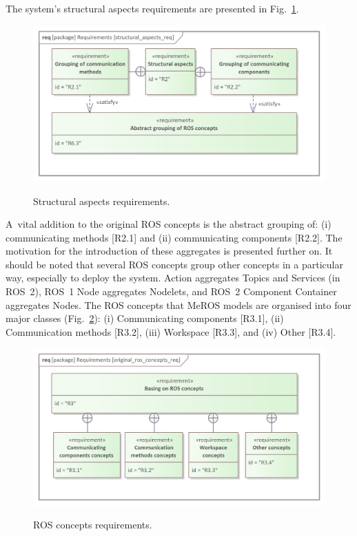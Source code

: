 \documentclass[11pt,oneside,a4paper]{article}
\begin{document}
	The system's structural aspects requirements are presented in Fig.~\ref{fig:structural_aspects_req}.
	
	\begin{figure}[H]
		\centering
		\begin{center}
			{\includegraphics[scale=0.95]{img/requirement_pkg/structural_aspects_req.png}}
		\end{center}
		\caption{Structural aspects requirements.} 
		\label{fig:structural_aspects_req}
	\end{figure}
	
	A~vital addition to the original ROS concepts is the abstract grouping of: (i) communicating methods [R2.1] and (ii) communicating components [R2.2]. The motivation for the introduction of these aggregates is presented further on. It should be noted that several ROS concepts group other concepts in a particular way, especially to deploy the system. Action aggregates Topics and Services (in ROS~2), ROS~1 Node aggregates Nodelets, and ROS~2 Component Container aggregates Nodes.
	The ROS concepts that MeROS models are organised into four major classes (Fig.~\ref{fig:ros_concepts_req}): (i) Communicating components [R3.1], (ii) Communication methods [R3.2], (iii) Workspace [R3.3], and (iv) Other [R3.4].
	

	\begin{figure}[H]
		\centering
		\begin{center}
			{\includegraphics[scale=1.1]{img/requirement_pkg/original_ros_concepts_req.png}}
		\end{center}
		\caption{ROS concepts requirements.} 
		\label{fig:ros_concepts_req}
	\end{figure}
	
\end{document}
